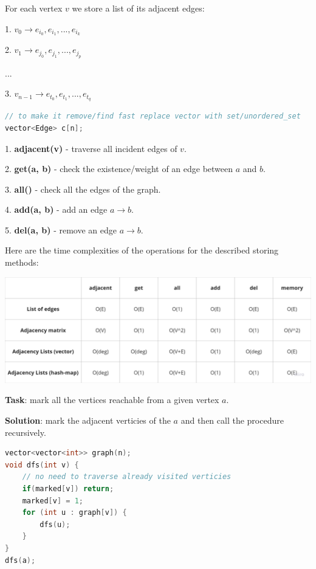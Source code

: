 For each vertex $v$ we store a list of its adjacent edges:

1. $v_0 \to e_{i_0}, e_{i_1}, ..., e_{i_k}$

2. $v_1 \to e_{j_0}, e_{j_1}, ..., e_{j_p}$

...

3. $v_{n-1} \to e_{t_0}, e_{t_1}, ..., e_{t_q}$

\begin{lstlisting}[language=C++]
// to make it remove/find fast replace vector with set/unordered_set
vector<Edge> c[n];
\end{lstlisting}


1. \textbf{adjacent(v)} - traverse all incident edges of $v$.

2. \textbf{get(a, b)} - check the existence/weight of an edge between $a$ and $b$.

3. \textbf{all()} - check all the edges of the graph.

4. \textbf{add(a, b)} - add an edge $a \to b$.

5. \textbf{del(a, b)} - remove an edge $a \to b$.

Here are the time complexities of the operations for the described storing methods:

\begin{center}
    \includegraphics[scale=0.25]{./assets/14-graphs-and-basic-dfs/1.png}
\end{center}



\textbf{Task}: mark all the vertices reachable from a given vertex $a$.

\textbf{Solution}: mark the adjacent verticies of the $a$ and then call the procedure recursively.

\begin{lstlisting}[language=C++]
vector<vector<int>> graph(n);
void dfs(int v) {
    // no need to traverse already visited verticies
    if(marked[v]) return;
    marked[v] = 1;
    for (int u : graph[v]) {
        dfs(u);
    }
}
dfs(a);
\end{lstlisting}

